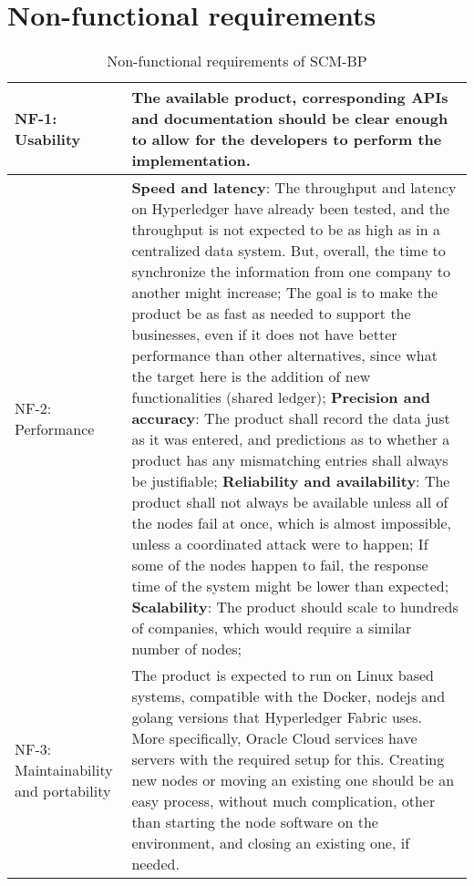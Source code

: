 \section{Non-functional requirements}{} %

\begin{table}[H]
\caption{Non-functional requirements of \ac{SCM-BP}}
\label{table:rnf}
\begin{tabular}{|p{3cm}|p{12cm}|}
\hline
NF-1: Usability & The available product, corresponding APIs and documentation should be clear enough to allow for the developers to perform the implementation.\\
\hline
NF-2:  \newline Performance &  \textbf{Speed and latency}:  The throughput and latency on Hyperledger have already been tested, and the throughput is not expected to be as high as in a centralized data system. But, overall, the time to synchronize the information from one company to another might increase; The goal is to make the product be as fast as needed to support the businesses, even if it does not have better performance than other alternatives, since what the target here is the addition of new functionalities (shared ledger); \newline
\textbf{Precision and accuracy}: The product shall record the data just as it was entered, and predictions as to whether a product has any mismatching entries shall always be justifiable; \newline
\textbf{Reliability and availability}: The product shall not always be available unless all of the nodes fail at once, which is almost impossible, unless a coordinated attack were to happen; If some of the nodes happen to fail, the response time of the system might be lower than expected; \newline
\textbf{Scalability}: The product should scale to hundreds of companies, which would require a similar number of nodes;
\\
\hline
NF-3:  \newline Maintainability and portability & The product is expected to run on Linux based systems, compatible with the Docker, nodejs and golang versions that Hyperledger Fabric uses. More specifically, Oracle Cloud services have servers with the required setup for this. Creating new nodes or moving an existing one should be an easy process, without much complication, other than starting the node software on the environment, and closing an existing one, if needed. \\

\end{tabular}
\end{table}
